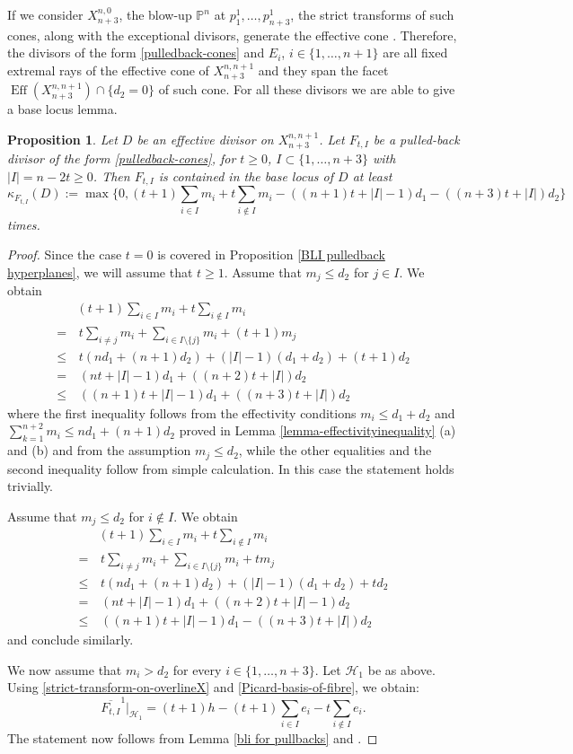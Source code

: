 \documentclass[a4paper,11pt]{article}
\newtheorem{proposition}[theorem]{Proposition}
\newcommand{\PP}{\mathbb P}
\newcommand{\Eff}{\operatorname{Eff}}
\begin{document}
If we consider $X^{n,0}_{n+3}$, the blow-up $\PP^n$ at $p^1_1,\dots,p^1_{n+3}$, the strict transforms of such cones, along with the exceptional divisors, generate the effective cone \cite{BDPn+3,CT06}.
Therefore, the divisors of the form \eqref{pulledback-cones} and $E_i$, $i\in\{1,\dots,n+1\}$ are all fixed extremal rays of the effective cone of $X^{n,n+1}_{n+3}$ and they span the facet $\Eff(X^{n,n+1}_{n+3})\cap \{d_2=0\}$ of such cone. For all these divisors we are able to give a base locus lemma.
%
\begin{proposition}\label{prop-bli-pulledbackcone}
Let $D$ be an effective divisor on $X^{n,n+1}_{n+3}$. Let $F_{t,I}$ be a pulled-back divisor of the form \eqref{pulledback-cones}, for $t\ge0$, $I\subset\{1,\dots,n+3\}$ with $|I|=n-2t\ge0$.
Then $F_{t,I}$ is contained in the base locus of $D$ at least $$
\kappa_{F_{t,I}}(D):=\max\{0,(t+1)\sum_{i\in I}m_i+t\sum_{i\notin I}m_i-((n+1)t+|I|-1)d_1-((n+3)t+|I|)d_2\}
$$
times.
\end{proposition}
\begin{proof}
Since the case $t=0$ is covered in Proposition \ref{BLI pulledback hyperplanes}, we will assume that $t\ge1$.
Assume that $m_j\le d_2$ for $j\in I$. We obtain
\begin{align*}
& (t+1)\sum_{i\in I}m_i+t\sum_{i\notin I}m_i\\
=& \, t\sum_{i\ne j}m_i+\sum_{i\in I\setminus\{j\}}m_i+(t+1)m_j\\
\le& \, t(nd_1+(n+1)d_2)+(|I|-1)(d_1+d_2)+(t+1)d_2\\
=& \,(nt+|I|-1)d_1+((n+2)t+|I|)d_2\\
\le& \, ((n+1)t+|I|-1)d_1+((n+3)t+|I|)d_2
\end{align*}
where the first inequality follows from the effectivity conditions $m_i\le d_1+d_2$ and
$\sum_{k=1}^{n+2}m_i\le nd_1+(n+1)d_2$ proved in Lemma \ref{lemma-effectivityinequality} (a) and (b) and from the assumption $m_j\le d_2$, while the other equalities and the second inequality follow from simple calculation.
In this case the statement holds trivially.

Assume that $m_j\le d_2$ for $i\notin I$. We obtain
\begin{align*}
& (t+1)\sum_{i\in I}m_i+t\sum_{i\notin I}m_i\\
=& \, t\sum_{i\ne j}m_i+\sum_{i\in I\setminus\{j\}}m_i+tm_j\\
\le& \, t(nd_1+(n+1)d_2)+(|I|-1)(d_1+d_2)+td_2\\
=& \, (nt+|I|-1)d_1+((n+2)t+|I|-1)d_2\\
\le& \, ((n+1)t+|I|-1)d_1-((n+3)t+|I|)d_2
\end{align*}
and conclude similarly.


We now assume that $m_i> d_2 $ for every $i\in\{1,\dots,n+3\}$.
Let $\mathcal{H}_1$ be as above. Using \eqref{strict-transform-on-overlineX} and \eqref{Picard-basis-of-fibre}, we obtain:
$$
{\overline{F_{t,I}}^1}|_{\mathcal{H}_1}=(t+1)h-(t+1)\sum_{i\in I}e_{i}-t\sum_{i\notin I}e_i.
$$
The statement now follows from Lemma \ref{bli for pullbacks} and \cite[Lemma 4.1]{BDPn+3}.
\end{proof}
\end{document}
